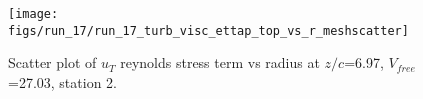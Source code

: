 \begin{figure}[H]
\centering
\texttt{[image: figs/run\_17/run\_17\_turb\_visc\_ettap\_top\_vs\_r\_meshscatter]}
\caption{Scatter plot of $
u_T$ reynolds stress term vs radius at $z/c$=6.97, $V_{free}$=27.03, station 2.}
\label{fig:run_17_turb_visc_ettap_top_vs_r_meshscatter}
\end{figure}


